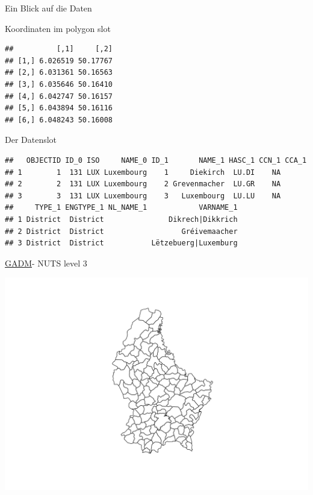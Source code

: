\documentclass[ignorenonframetext,]{beamer}
\begin{document}
\begin{frame}[fragile]{Ein Blick auf die Daten}
\protect\hypertarget{ein-blick-auf-die-daten}{}

Koordinaten im polygon slot

\begin{verbatim}
##          [,1]     [,2]
## [1,] 6.026519 50.17767
## [2,] 6.031361 50.16563
## [3,] 6.035646 50.16410
## [4,] 6.042747 50.16157
## [5,] 6.043894 50.16116
## [6,] 6.048243 50.16008
\end{verbatim}

\end{frame}

\begin{frame}[fragile]{Der Datenslot}
\protect\hypertarget{der-datenslot}{}

\begin{verbatim}
##   OBJECTID ID_0 ISO     NAME_0 ID_1       NAME_1 HASC_1 CCN_1 CCA_1
## 1        1  131 LUX Luxembourg    1     Diekirch  LU.DI    NA      
## 2        2  131 LUX Luxembourg    2 Grevenmacher  LU.GR    NA      
## 3        3  131 LUX Luxembourg    3   Luxembourg  LU.LU    NA      
##     TYPE_1 ENGTYPE_1 NL_NAME_1            VARNAME_1
## 1 District  District               Dikrech|Dikkrich
## 2 District  District                  Gréivemaacher
## 3 District  District           Lëtzebuerg|Luxemburg
\end{verbatim}

\end{frame}

\begin{frame}{\href{http://www.gadm.org/}{GADM}- NUTS level 3}
\protect\hypertarget{gadm--nuts-level-3}{}

\includegraphics{Shapefiles_files/figure-beamer/LUX3-1.pdf}

\end{frame}
\end{document}
